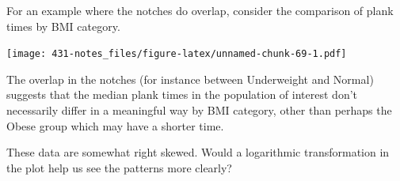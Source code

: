 \documentclass[
]{book}
\newenvironment{Shaded}{\begin{snugshade}}{\end{snugshade}}
\newcommand{\DataTypeTok}[1]{\textcolor[rgb]{0.13,0.29,0.53}{#1}}
\newcommand{\FloatTok}[1]{\textcolor[rgb]{0.00,0.00,0.81}{#1}}
\newcommand{\KeywordTok}[1]{\textcolor[rgb]{0.13,0.29,0.53}{\textbf{#1}}}
\newcommand{\NormalTok}[1]{#1}
\newcommand{\OperatorTok}[1]{\textcolor[rgb]{0.81,0.36,0.00}{\textbf{#1}}}
\newcommand{\OtherTok}[1]{\textcolor[rgb]{0.56,0.35,0.01}{#1}}
\newcommand{\StringTok}[1]{\textcolor[rgb]{0.31,0.60,0.02}{#1}}
\begin{document}
For an example where the notches do overlap, consider the comparison of plank times by BMI category.

\begin{Shaded}
\end{Shaded}

\texttt{[image: 431-notes\_files/figure-latex/unnamed-chunk-69-1.pdf]}

The overlap in the notches (for instance between Underweight and Normal) suggests that the median plank times in the population of interest don't necessarily differ in a meaningful way by BMI category, other than perhaps the Obese group which may have a shorter time.

These data are somewhat right skewed. Would a logarithmic transformation in the plot help us see the patterns more clearly?
\end{document}
